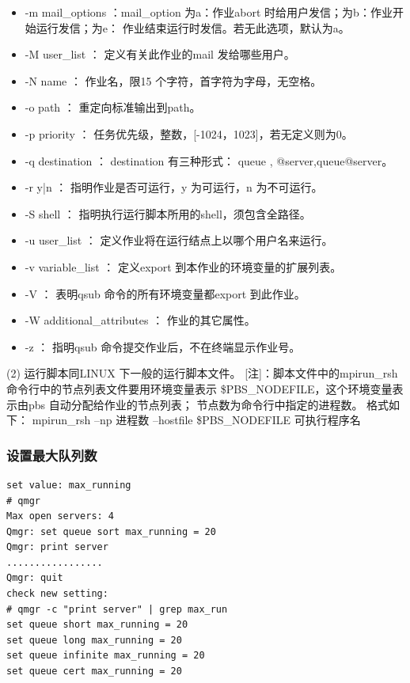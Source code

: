 {\begin{itemize}
\begin{itemize}
	\item nodes=N:ppn=M ：请求N 个结点，每个结点M 个处理器。
	\end{itemize}

\item -m mail\_options ：mail\_option 为a：作业abort 时给用户发信；为b：作业开始运行发信；为e：
作业结束运行时发信。若无此选项，默认为a。

\item -M user\_list ： 定义有关此作业的mail 发给哪些用户。

\item -N name ： 作业名，限15 个字符，首字符为字母，无空格。

\item -o path ： 重定向标准输出到path。

\item -p priority ： 任务优先级，整数，[-1024，1023]，若无定义则为0。

\item -q destination ： destination 有三种形式： queue , @server,queue@server。

\item -r y|n ： 指明作业是否可运行，y 为可运行，n 为不可运行。

\item -S shell ： 指明执行运行脚本所用的shell，须包含全路径。

\item -u user\_list ： 定义作业将在运行结点上以哪个用户名来运行。

\item -v variable\_list ： 定义export 到本作业的环境变量的扩展列表。

\item -V ： 表明qsub 命令的所有环境变量都export 到此作业。

\item -W additional\_attributes ： 作业的其它属性。

\item -z ： 指明qsub 命令提交作业后，不在终端显示作业号。
\end{itemize}


(2) 运行脚本同LINUX 下一般的运行脚本文件。
[注]：脚本文件中的mpirun\_rsh 命令行中的节点列表文件要用环境变量表示
\$PBS\_NODEFILE，这个环境变量表示由pbs 自动分配给作业的节点列表；
节点数为命令行中指定的进程数。
格式如下：
mpirun\_rsh –np 进程数 –hostfile \$PBS\_NODEFILE 可执行程序名



\subsubsection{设置最大队列数}
\begin{verbatim}
set value: max_running
# qmgr
Max open servers: 4
Qmgr: set queue sort max_running = 20
Qmgr: print server
.................
Qmgr: quit
check new setting:
# qmgr -c "print server" | grep max_run
set queue short max_running = 20
set queue long max_running = 20
set queue infinite max_running = 20
set queue cert max_running = 20
\end{verbatim}

}
